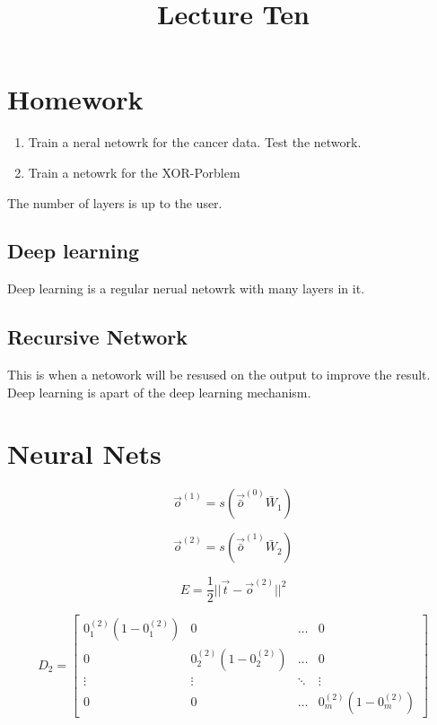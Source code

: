 \documentclass[letterpaper, 9pt]{article}
\title{Lecture Ten}
\begin{document}
\maketitle

\section{Homework}

\begin{enumerate}
\item Train a neral netowrk for the cancer data. Test the network.
\item Train a netowrk for the XOR-Porblem
\end{enumerate}

The number of layers is up to the user.

\subsection{Deep learning}
Deep learning is a regular nerual netowrk with many layers in it.

\subsection{Recursive Network}

This is when a netowork will be resused on the output to improve the result. Deep learning is apart of the deep learning mechanism.

\section{Neural Nets}
\begin{equation}
\vec{o}^{(1)} = s(\vec{\bar{o}}^{(0)} \bar{W}_1)
\end{equation}

\begin{equation}
\vec{o}^{(2)} = s(\vec{\bar{o}}^{(1)} \bar{W}_2)
\end{equation}

\begin{equation}
E = \frac{1}{2} || \vec{t} - \vec{o}^{(2)} || ^2
\end{equation}

\begin{equation}
D_2 =
\begin{bmatrix}
0_1^{(2)}(1 - 0_1^{(2)}) & 0 & \dots & 0 \\
0 & 0_2^{(2)}(1 - 0_2^{(2)}) & \dots & 0\\
\vdots & \vdots & \ddots & \vdots \\
0 & 0 & \dots & 0_m^{(2)}(1 - 0_m^{(2)})
\end{bmatrix}
\end{equation}
\end{document}
